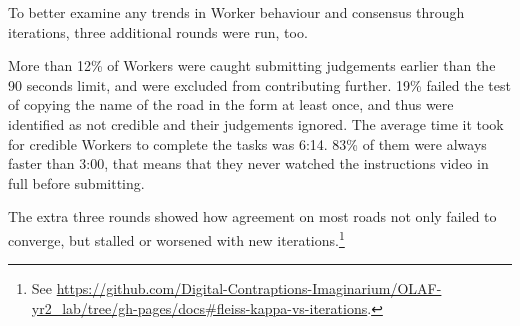 To better examine any trends in Worker behaviour and consensus through iterations, three additional rounds were run, too. 

More than 12\% of Workers were caught submitting judgements earlier than the 90 seconds limit, and were excluded from contributing further. 19\% failed the test of copying the name of the road in the form at least once, and thus were identified as not credible and their judgements ignored. The average time it took for credible Workers to complete the tasks was 6:14. 83\% of them were always faster than 3:00, that means that they never watched the instructions video in full before submitting.

The extra three rounds showed how agreement on most roads not only failed to converge, but stalled or worsened with new iterations.\footnote{See \url{https://github.com/Digital-Contraptions-Imaginarium/OLAF-yr2_lab/tree/gh-pages/docs#fleiss-kappa-vs-iterations}.} 

